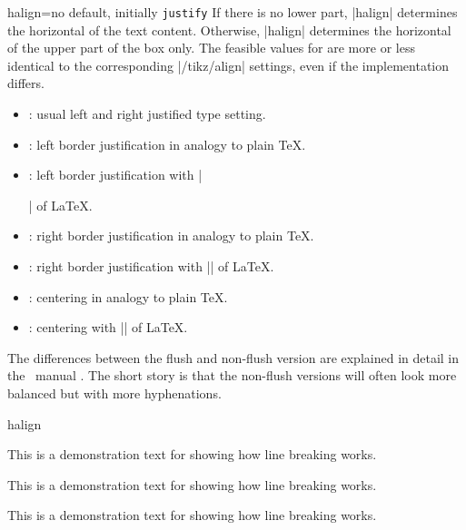 \begin{docTcbKey}[][doc new=2015-05-07]{halign}{=}{no default, initially \texttt{justify}}
  If there is no lower part, |halign| determines the horizontal 
  of the text content.
  Otherwise, |halign| determines the horizontal 
  of the upper part of the box only.
  The feasible values for  are more or less identical to
  the corresponding |/tikz/align| settings, even if the implementation differs.
  \begin{itemize}
  \item{}: usual left and right justified type setting.
  \item{}: left border justification in analogy to plain \TeX.
  \item{}: left border justification with |\raggedright| of \LaTeX.
  \item{}: right border justification in analogy to plain \TeX.
  \item{}: right border justification with |\raggedleft| of \LaTeX.
  \item{}: centering in analogy to plain \TeX.
  \item{}: centering with |\centering| of \LaTeX.
  \end{itemize}
  The differences between the flush and non-flush version are explained in
  detail in the \tikzname\ manual \cite{tantau:tikz_and_pgf}. The short story is that
  the non-flush versions will often look more balanced but with more
  hyphenations.

\begin{exdispExample}{halign}

\begin{tcolorbox}[adjusted title=flush center,halign=flush center]
This is a demonstration text for showing how line breaking works.
\end{tcolorbox}
\begin{tcolorbox}[adjusted title=flush left,halign=flush left]
This is a demonstration text for showing how line breaking works.
\end{tcolorbox}
\begin{tcolorbox}[adjusted title=flush right,halign=flush right]
This is a demonstration text for showing how line breaking works.
\end{tcolorbox}


\end{exdispExample}
\end{docTcbKey}
